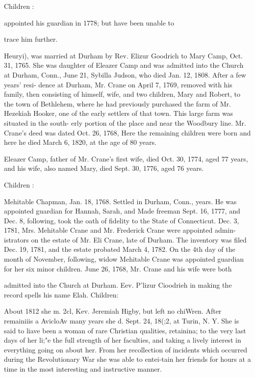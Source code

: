 \documentclass{book}
\begin{document}
Children : 







appointed his guardian in 1778; but have been unable to 

trace him further. 

Heuryi), was married at Durham by Rev. Elizur Goodrich to 
Mary Camp, Oct. 31, 1765. She was daughter of Eleazer Camp 
and was admitted into the Church at Durham, Conn., June 21, 
Sybilla Judson, who died Jan. 12, 1808. After a few years' resi- 
dence at Durham, Mr. Crane on April 7, 1769, removed with his 
family, then consisting of himself, wife, and two children, Mary 
and Robert, to the town of Bethlehem, where he had previously 
purchased the farm of Mr. Hezekiah Hooker, one of the early 
settlers of that town. This large farm was situated in the south- 
erly portion of the place and near the Woodbury line. Mr. 
Crane's deed was dated Oct. 26, 1768, Here the remaining 
children were born and here he died March 6, 1820, at the age 
of 80 years. 

Eleazer Camp, father of Mr. Crane's first wife, died Oct. 30, 
1774, aged 77 years, and his wife, also named Mary, died Sept. 
30, 1776, aged 76 years. 

Children : 









Mehitable Chapman, Jan. 18, 1768. Settled in Durham, Conn., 
years. He was appointed guardian for Hannah, Sarah, and 
Made freeman Sept. 16, 1777, and Dec. 8, following, took the 
oath of fidelity to the State of Connecticut. Dec. 3, 1781, Mrs. 
Mehitable Crane and Mr. Frederick Crane were appointed admin- 
istrators on the estate of Mr. Eli Crane, late of Durham. The 
inventory was filed Dec. 19, 1781, and the estate probated March 
4, 1782. On the 4th day of the month of November, following, 
widow Mehitable Crane was appointed guardian for her six minor 
children. June 26, 1768, Mr. Crane and his wife were both 




admitted into the Church at Durham. Eev. P'lizur Cioodrieh in 
making the record spells his name Elah. Children: 

About 1812 she m. 2cl, Kev. Jeremiah Higby, but left no 
chiWren. After remainiiis a AvicloAv many years she d. Sept. 
24, 18(;2, at Turin, N. Y. She is said to liave been a woman 
of rare Christian qualities, retainina; to the very last days 
of her li;"e the full strength of her faculties, and taking a 
lively interest in everything going on about her. From 
her recollection of incidents which occurred during the 
Revolutionary War she was able to entei-tain her friends 
for hours at a time in the most interesting and instructive 
manner. 
\end{document}
